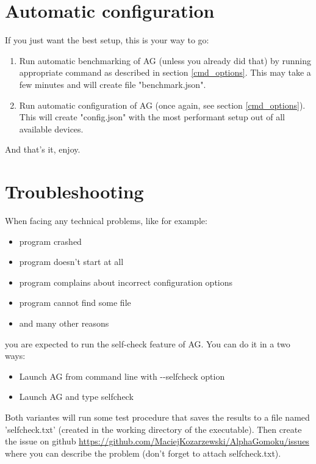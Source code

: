 \documentclass[12pt,a4paper]{article}
\begin{document}
\section{Automatic configuration}
\label{auto_config}
If you just want the best setup, this is your way to go:
\begin{enumerate}
\item{Run automatic benchmarking of AG (unless you already did that) by running appropriate command as described in section \ref{cmd_options}. This may take a few minutes and will create file "benchmark.json".}
\item{Run automatic configuration of AG (once again, see section \ref{cmd_options}). This will create "config.json" with the most performant setup out of all available devices.}
\end{enumerate}
And that's it, enjoy.



\newpage
\section{Troubleshooting}
\label{trouble_shooting}
When facing any technical problems, like for example: 
\begin{itemize}
	\item{program crashed}
	\item{program doesn't start at all}
	\item{program complains about incorrect configuration options}
	\item{program cannot find some file}
	\item{and many other reasons}
\end{itemize}
you are expected to run the self-check feature of AG. You can do it in a two ways:
\begin{itemize}
	\item{Launch AG from command line with -{}-selfcheck option}
	\item{Launch AG and type selfcheck}
\end{itemize}
Both variantes will run some test procedure that saves the results to a file named 'selfcheck.txt' (created in the working directory of the executable). Then create the issue on github \href{https://github.com/MaciejKozarzewski/AlphaGomoku/issues}{https://github.com/MaciejKozarzewski/AlphaGomoku/issues} where you can describe the problem (don't forget to attach selfcheck.txt).


\newpage
\end{document}
